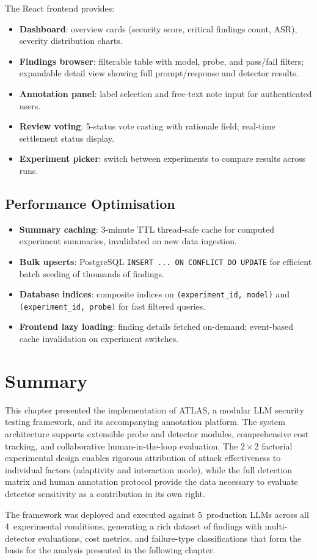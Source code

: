 \documentclass[12pt,a4paper]{report}
\begin{document}
The React frontend provides:
\begin{itemize}
    \item \textbf{Dashboard}: overview cards (security score, critical findings count, ASR), severity distribution charts.
    \item \textbf{Findings browser}: filterable table with model, probe, and pass/fail filters; expandable detail view showing full prompt/response and detector results.
    \item \textbf{Annotation panel}: label selection and free-text note input for authenticated users.
    \item \textbf{Review voting}: 5-status vote casting with rationale field; real-time settlement status display.
    \item \textbf{Experiment picker}: switch between experiments to compare results across runs.
\end{itemize}

\subsection{Performance Optimisation}

\begin{itemize}
    \item \textbf{Summary caching}: 3-minute TTL thread-safe cache for computed experiment summaries, invalidated on new data ingestion.
    \item \textbf{Bulk upserts}: PostgreSQL \texttt{INSERT ... ON CONFLICT DO UPDATE} for efficient batch seeding of thousands of findings.
    \item \textbf{Database indices}: composite indices on \texttt{(experiment\_id, model)} and \texttt{(experiment\_id, probe)} for fast filtered queries.
    \item \textbf{Frontend lazy loading}: finding details fetched on-demand; event-based cache invalidation on experiment switches.
\end{itemize}

\section{Summary}
\label{sec:impl-summary}

This chapter presented the implementation of ATLAS, a modular LLM security testing framework, and its accompanying annotation platform. The system architecture supports extensible probe and detector modules, comprehensive cost tracking, and collaborative human-in-the-loop evaluation. The $2 \times 2$ factorial experimental design enables rigorous attribution of attack effectiveness to individual factors (adaptivity and interaction mode), while the full detection matrix and human annotation protocol provide the data necessary to evaluate detector sensitivity as a contribution in its own right.

The framework was deployed and executed against 5~production LLMs across all 4~experimental conditions, generating a rich dataset of findings with multi-detector evaluations, cost metrics, and failure-type classifications that form the basis for the analysis presented in the following chapter.
\end{document}
